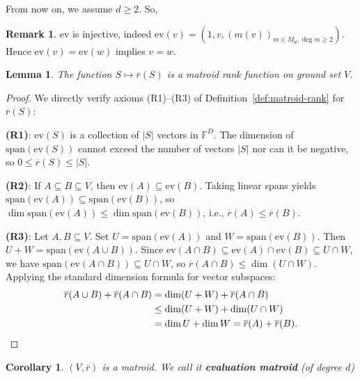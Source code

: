 \documentclass[11pt,a4paper]{article}
\newtheorem{lemma}[theorem]{Lemma}
\newtheorem{corollary}[theorem]{Corollary}
\theoremstyle{definition}
\newtheorem{remark}[theorem]{Remark}
\begin{document}
From now on, we assume $d \ge 2$. So,
\begin{remark}
    $\mathrm{ev}$ is injective, indeed $\mathrm{ev}(v) = (1, v, (m(v))_{m \in M_d, \deg m \ge 2})$. Hence $\mathrm{ev}(v)=\mathrm{ev}(w)$ implies $v = w$.
\end{remark}

\begin{lemma}\label{obs:boolean-matroid}
The function $S \mapsto \overline{r}(S)$ is a matroid rank function on ground set $V$.
\end{lemma}

\begin{proof}
We directly verify axioms (R1)--(R3) of Definition~\ref{def:matroid-rank} for $\overline{r}(S)$:

\textbf{(R1)}: $\mathrm{ev}(S)$ is a collection of $|S|$ vectors in $\mathbb{F}^D$. The dimension of $\mathrm{span}(\mathrm{ev}(S))$ cannot exceed the number of vectors $|S|$ nor can it be negative, so $0 \le \overline{r}(S) \le |S|$.

\textbf{(R2)}: If $A \subseteq B \subseteq V$, then $\mathrm{ev}(A) \subseteq \mathrm{ev}(B)$. Taking linear spans yields $\mathrm{span}(\mathrm{ev}(A)) \subseteq \mathrm{span}(\mathrm{ev}(B))$, so $\dim \mathrm{span}(\mathrm{ev}(A)) \le \dim \mathrm{span}(\mathrm{ev}(B))$, i.e., $\overline{r}(A) \le \overline{r}(B)$.

\textbf{(R3)}: Let $A, B \subseteq V$. Set $U = \mathrm{span}(\mathrm{ev}(A))$ and $W = \mathrm{span}(\mathrm{ev}(B))$. Then $U + W = \mathrm{span}(\mathrm{ev}(A \cup B))$. Since $\mathrm{ev}(A \cap B) \subseteq \mathrm{ev}(A) \cap \mathrm{ev}(B) \subseteq U \cap W$, we have $\mathrm{span}(\mathrm{ev}(A \cap B)) \subseteq U \cap W$, so $\overline{r}(A \cap B) \le \dim(U \cap W)$. Applying the standard dimension formula for vector subspaces:
\begin{align*}
\overline{r}(A \cup B) + \overline{r}({A \cap B}) &= \dim(U + W) + \overline{r}(A \cap B) \\
&\le \dim(U + W) + \dim(U \cap W) \\
&= \dim U + \dim W = \overline{r}(A) + \overline{r}(B). \qedhere
\end{align*}
\end{proof} 

\begin{corollary}
    $(V,\overline{r})$ is a matroid. We call it \textbf{evaluation matroid} (of degree $d$)
\end{corollary}
\end{document}

